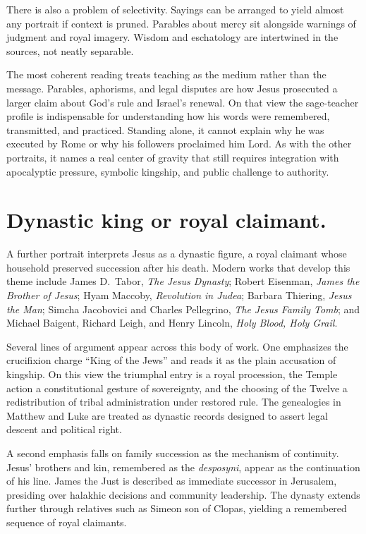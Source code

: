 There is also a problem of selectivity.
Sayings can be arranged to yield almost any portrait if context is pruned.
Parables about mercy sit alongside warnings of judgment and royal imagery.
Wisdom and eschatology are intertwined in the sources, not neatly separable.

The most coherent reading treats teaching as the medium rather than the message.
Parables, aphorisms, and legal disputes are how Jesus prosecuted a larger claim about God’s rule and Israel’s renewal.
On that view the sage-teacher profile is indispensable for understanding how his words were remembered, transmitted, and practiced.
Standing alone, it cannot explain why he was executed by Rome or why his followers proclaimed him Lord.
As with the other portraits, it names a real center of gravity that still requires integration with apocalyptic pressure, symbolic kingship, and public challenge to authority.

\section{Dynastic king or royal claimant.}\label{sec:dynastic}

A further portrait interprets Jesus as a dynastic figure, a royal claimant whose household preserved succession after his death.
Modern works that develop this theme include James D.\ Tabor, \emph{The Jesus Dynasty}; Robert Eisenman, \emph{James the Brother of Jesus}; Hyam Maccoby, \emph{Revolution in Judea}; Barbara Thiering, \emph{Jesus the Man}; Simcha Jacobovici and Charles Pellegrino, \emph{The Jesus Family Tomb}; and Michael Baigent, Richard Leigh, and Henry Lincoln, \emph{Holy Blood, Holy Grail}.

Several lines of argument appear across this body of work.
One emphasizes the crucifixion charge ``King of the Jews'' and reads it as the plain accusation of kingship.
On this view the triumphal entry is a royal procession, the Temple action a constitutional gesture of sovereignty, and the choosing of the Twelve a redistribution of tribal administration under restored rule.
The genealogies in Matthew and Luke are treated as dynastic records designed to assert legal descent and political right.

A second emphasis falls on family succession as the mechanism of continuity.
Jesus’ brothers and kin, remembered as the \emph{desposyni}, appear as the continuation of his line.
James the Just is described as immediate successor in Jerusalem, presiding over halakhic decisions and community leadership.
The dynasty extends further through relatives such as Simeon son of Clopas, yielding a remembered sequence of royal claimants.

